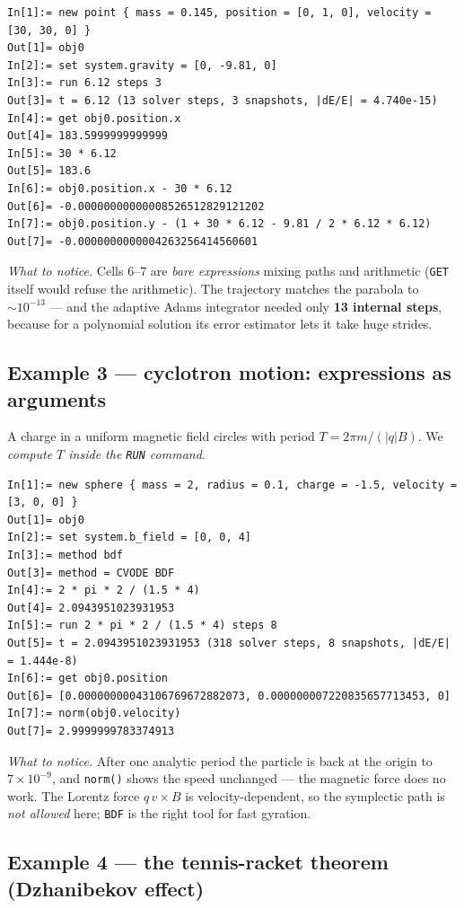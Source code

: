 \documentclass[11pt]{article}
\newcommand{\kw}[1]{\texttt{\uppercase{#1}}}
\newcommand{\code}[1]{\texttt{#1}}
\begin{document}
\begin{lstlisting}
In[1]:= new point { mass = 0.145, position = [0, 1, 0], velocity = [30, 30, 0] }
Out[1]= obj0
In[2]:= set system.gravity = [0, -9.81, 0]
In[3]:= run 6.12 steps 3
Out[3]= t = 6.12 (13 solver steps, 3 snapshots, |dE/E| = 4.740e-15)
In[4]:= get obj0.position.x
Out[4]= 183.5999999999999
In[5]:= 30 * 6.12
Out[5]= 183.6
In[6]:= obj0.position.x - 30 * 6.12
Out[6]= -0.00000000000008526512829121202
In[7]:= obj0.position.y - (1 + 30 * 6.12 - 9.81 / 2 * 6.12 * 6.12)
Out[7]= -0.0000000000004263256414560601
\end{lstlisting}

\emph{What to notice.} Cells 6--7 are \emph{bare expressions} mixing
paths and arithmetic (\kw{get} itself would refuse the arithmetic). The
trajectory matches the parabola to $\sim\!10^{-13}$ --- and the adaptive
Adams integrator needed only \textbf{13 internal steps}, because for a
polynomial solution its error estimator lets it take huge strides.

\subsection{Example 3 --- cyclotron motion: expressions as arguments}

A charge in a uniform magnetic field circles with period
$T = 2\pi m/(|q|B)$. We \emph{compute $T$ inside the \kw{run} command}.

\begin{lstlisting}
In[1]:= new sphere { mass = 2, radius = 0.1, charge = -1.5, velocity = [3, 0, 0] }
Out[1]= obj0
In[2]:= set system.b_field = [0, 0, 4]
In[3]:= method bdf
Out[3]= method = CVODE BDF
In[4]:= 2 * pi * 2 / (1.5 * 4)
Out[4]= 2.0943951023931953
In[5]:= run 2 * pi * 2 / (1.5 * 4) steps 8
Out[5]= t = 2.0943951023931953 (318 solver steps, 8 snapshots, |dE/E| = 1.444e-8)
In[6]:= get obj0.position
Out[6]= [0.00000000043106769672882073, 0.000000007220835657713453, 0]
In[7]:= norm(obj0.velocity)
Out[7]= 2.9999999783374913
\end{lstlisting}

\emph{What to notice.} After one analytic period the particle is back at
the origin to $7\times10^{-9}$, and \code{norm()} shows the speed
unchanged --- the magnetic force does no work. The Lorentz force
$q\,v\times B$ is velocity-dependent, so the symplectic path is
\emph{not allowed} here; \kw{bdf} is the right tool for fast gyration.

\subsection{Example 4 --- the tennis-racket theorem (Dzhanibekov effect)}
\end{document}
